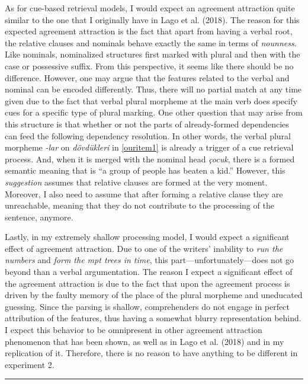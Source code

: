 \documentclass[english,doc]{apa6}
\begin{document}
As for cue-based retrieval models, I would expect an agreement attraction quite similar to the one that I originally have in Lago et al. (2018). The reason for this expected agreement attraction is the fact that apart from having a verbal root, the relative clauses and nominals behave exactly the same in terms of \emph{nounness}. Like nominals, nominalized structures first marked with plural and then with the case or possessive suffix. From this perspective, it seems like there should be no difference. However, one may argue that the features related to the verbal and nominal can be encoded differently. Thus, there will no partial match at any time given due to the fact that verbal plural morpheme at the main verb does specify cues for a specific type of plural marking. One other question that may arise from this structure is that whether or not the parts of already-formed dependencies can feed the following dependency resolution. In other words, the verbal plural morpheme \emph{-lar} on \emph{dövdükleri} in \autoref{ouritem1} is already a trigger of a cue retrieval process. And, when it is merged with the nominal head \emph{çocuk}, there is a formed semantic meaning that is \enquote{a group of people has beaten a kid.} However, this \emph{suggestion} assumes that relative clauses are formed at the very moment. Moreover, I also need to assume that after forming a relative clause they are unreachable, meaning that they do not contribute to the processing of the sentence, anymore.

Lastly, in my extremely shallow processing model, I would expect a significant effect of agreement attraction. Due to one of the writers' inability to \emph{run the numbers} and \emph{form the mpt trees in time}, this part---unfortunately---does not go beyond than a verbal argumentation. The reason I expect a significant effect of the agreement attraction is due to the fact that upon the agreement process is driven by the faulty memory of the place of the plural morpheme and uneducated guessing. Since the parsing is shallow, comprehenders do not engage in perfect attribution of the features, thus having a somewhat blurry representation behind. I expect this behavior to be omnipresent in other agreement attraction phenomenon that has been shown, as well as in Lago et al. (2018) and in my replication of it. Therefore, there is no reason to have anything to be different in experiment 2.

\begin{center}\rule{0.5\linewidth}{0.5pt}\end{center}
\end{document}
